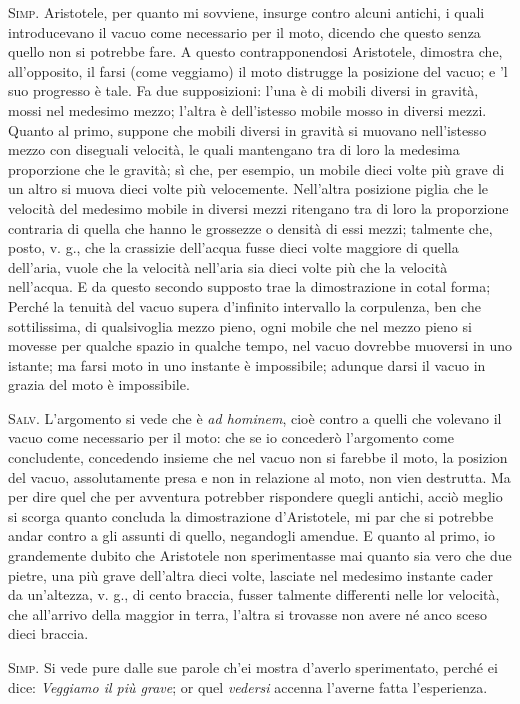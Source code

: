 \documentclass[11pt,twoside,openany]{book}
\newcommand{\speaker}[1]{\textcolor{rubric}{\textsc{#1}}\space}
\begin{document}
\speaker{Simp.} Aristotele, per quanto mi sovviene, insurge contro alcuni antichi, i quali introducevano il vacuo come necessario per il moto, dicendo che questo senza quello non si potrebbe fare. A questo contrapponendosi Aristotele, dimostra che, all'opposito, il farsi (come veggiamo) il moto distrugge la posizione del vacuo; e 'l suo progresso è tale. Fa due supposizioni: l'una è di mobili diversi in gravità, mossi nel medesimo mezzo; l'altra è dell'istesso mobile mosso in diversi mezzi. Quanto al primo, suppone che mobili diversi in gravità si muovano nell'istesso mezzo con diseguali velocità, le quali mantengano tra di loro la medesima proporzione che le gravità; sì che, per esempio, un mobile dieci volte più grave di un altro si muova dieci volte più velocemente. Nell'altra posizione piglia che le velocità del medesimo mobile in diversi mezzi ritengano tra di loro la proporzione contraria di quella che hanno le grossezze o densità di essi mezzi; talmente che, posto, v. g., che la crassizie dell'acqua fusse dieci volte maggiore di quella dell'aria, vuole che la velocità nell'aria sia dieci volte più che la velocità nell'acqua. E da questo secondo supposto trae la dimostrazione in cotal forma; Perché la tenuità del vacuo supera d'infinito intervallo la corpulenza, ben che sottilissima, di qualsivoglia mezzo pieno, ogni mobile che nel mezzo pieno si movesse per qualche spazio in qualche tempo, nel vacuo dovrebbe muoversi in uno istante; ma farsi moto in uno instante è impossibile; adunque darsi il vacuo in grazia del moto è impossibile.

\speaker{Salv.} L'argomento si vede che è \emph{ad hominem}, cioè contro a quelli che volevano il vacuo come necessario per il moto: che se io concederò l'argomento come concludente, concedendo insieme che nel vacuo non si farebbe il moto, la posizion del vacuo, assolutamente presa e non in relazione al moto, non vien destrutta. Ma per dire quel che per avventura potrebber rispondere quegli antichi, acciò meglio si scorga quanto concluda la dimostrazione d'Aristotele, mi par che si potrebbe andar contro a gli assunti di quello, negandogli amendue. E quanto al primo, io grandemente dubito che Aristotele non sperimentasse mai quanto sia vero che due pietre, una più grave dell'altra dieci volte, lasciate nel medesimo instante cader da un'altezza, v. g., di cento braccia, fusser talmente differenti nelle lor velocità, che all'arrivo della maggior in terra, l'altra si trovasse non avere né anco sceso dieci braccia.

\speaker{Simp.} Si vede pure dalle sue parole ch'ei mostra d'averlo sperimentato, perché ei dice: \emph{Veggiamo il più grave}; or quel \emph{vedersi} accenna l'averne fatta l'esperienza.
\end{document}
